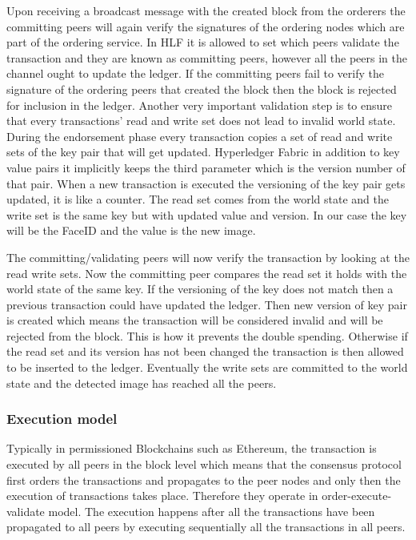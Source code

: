 Upon receiving a broadcast message with the created block from the orderers the committing peers will again verify the signatures of the ordering nodes which are part of the ordering service. In HLF it is allowed to set which peers validate the transaction and they are known as committing peers, however all the peers in the channel ought to update the ledger.
If the committing peers fail to verify the signature of the ordering peers that created the block then the block is rejected for inclusion in the ledger. Another very important validation step is to ensure that every transactions' read and write set does not lead to invalid world state. During the endorsement phase every transaction copies a set of read and write sets of the key pair that will get updated. Hyperledger Fabric in addition to key value pairs it implicitly keeps the third parameter which is the version number of that pair. When a new transaction is executed the versioning  of the key pair gets updated, it is like a counter. The read set comes from the world state and the write set is the same key but with updated value and version. In our case the key will be the FaceID and the value is the new image.

The committing/validating peers will now verify the transaction by looking at the read write sets. Now the committing peer compares the read set it holds with the world state of the same key. If the versioning of the key does not match then a previous transaction could have updated the ledger. Then new version of key pair is created which means the transaction will be considered invalid and will be rejected from the block. This is how it prevents the double spending. Otherwise if the read set and its version has not been changed the transaction is then allowed to be inserted to the ledger. Eventually the write sets are committed to the world state and the detected image has reached all the peers. 
 
 \subsubsection{Execution model}
 
 
 Typically in permissioned Blockchains such as Ethereum, the transaction is executed by all peers in the block level which means that the consensus protocol first orders the transactions and propagates to the peer nodes and only then the execution of transactions takes place. Therefore they operate in order-execute-validate model. The execution happens after all the transactions have been propagated to all peers by executing sequentially all the transactions in all peers.
 
